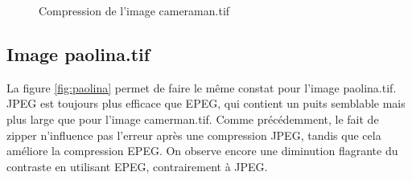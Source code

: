 \documentclass[12pt]{article}
\begin{document}
\begin{figure}[!h] 
	\centering
	\quad
	\caption{Compression de l'image \textsf{cameraman.tif}} 
	\label{fig:cameraman}
\end{figure}


\subsection{Image \textsf{paolina.tif}}
La figure \autoref{fig:paolina} permet de faire le même constat pour l'image \textsf{paolina.tif}. JPEG est toujours plus efficace que EPEG, qui contient un puits semblable mais plus large que pour l'image \textsf{camerman.tif}. Comme précédemment, le fait de zipper n'influence pas l'erreur après une compression JPEG, tandis que cela améliore la compression EPEG. On observe encore une diminution flagrante du contraste en utilisant EPEG, contrairement à JPEG.
\end{document}
